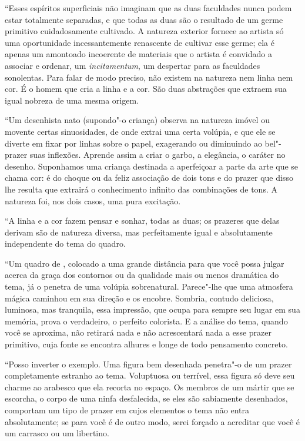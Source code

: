 “Esses espíritos superficiais não imaginam que as duas faculdades nunca
podem estar totalmente separadas, e que todas as duas são o resultado
de um germe primitivo cuidadosamente cultivado. A natureza exterior
fornece ao artista só uma oportunidade incessantemente renascente de
cultivar esse germe; ela é apenas um amontoado incoerente de materiais
que o artista é convidado a associar e ordenar, um
\textit{incitamentum}, um despertar para as faculdades sonolentas. Para
falar de modo preciso, não existem na natureza nem linha nem cor. É o
homem que cria a linha e a cor. São duas abstrações que extraem sua
igual nobreza de uma mesma origem.

“Um desenhista nato (supondo"-o criança) observa na natureza imóvel ou
movente certas sinuosidades, de onde extrai uma certa volúpia, e que
ele se diverte em fixar por linhas sobre o papel, exagerando ou
diminuindo ao bel"-prazer suas inflexões. Aprende assim a criar o garbo,
a elegância, o caráter no desenho. Suponhamos uma criança destinada a
aperfeiçoar a parte da arte que se chama cor: é do choque ou da feliz
associação de dois tons e do prazer que disso lhe resulta que extrairá
o conhecimento infinito das combinações de tons. A natureza foi, nos
dois casos, uma pura excitação.

“A linha e a cor fazem pensar e sonhar, todas as duas; os prazeres que
delas derivam são de natureza diversa, mas perfeitamente igual e
absolutamente independente do tema do quadro.

“Um quadro de , colocado a uma grande distância para que você
possa julgar acerca da graça dos contornos ou da qualidade mais ou
menos dramática do tema, já o penetra de uma volúpia sobrenatural.
Parece"-lhe que uma atmosfera mágica caminhou em sua direção e os
encobre. Sombria, contudo deliciosa, luminosa, mas tranquila, essa
impressão, que ocupa para sempre seu lugar em sua memória, prova o
verdadeiro, o perfeito colorista. E a análise do tema, quando você se
aproxima, não retirará nada e não acrescentará nada a esse prazer
primitivo, cuja fonte se encontra alhures e longe de todo pensamento
concreto.

“Posso inverter o exemplo. Uma figura bem desenhada penetra"-o de um
prazer completamente estranho ao tema. Voluptuosa ou terrível, essa
figura só deve seu charme ao arabesco que ela recorta no espaço. Os
membros de um mártir que se escorcha, o corpo de uma ninfa desfalecida,
se eles são sabiamente desenhados, comportam um tipo de prazer em cujos
elementos o tema não entra absolutamente; se para você é de outro modo,
serei forçado a acreditar que você é um carrasco ou um libertino.

